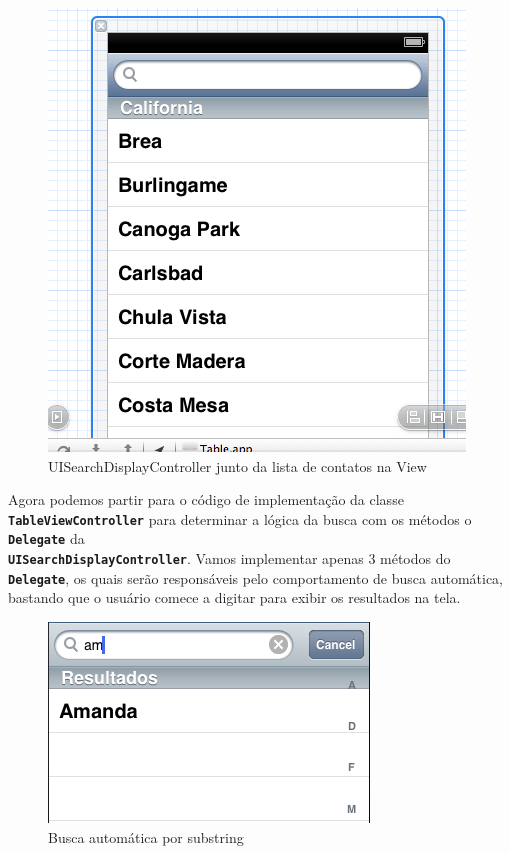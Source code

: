 \documentclass[a4paper,12pt,brazil,doubleside]{book}
\begin{document}
\begin{singlespace}
\begin{figure}[H]
  \centering
  \includegraphics[width=.75\textwidth]{figuras/table/table1.png}
  \caption{UISearchDisplayController junto da lista de contatos na View}
  \label{fig:a}
\end{figure}

\bigskip


Agora podemos partir para o código de implementação da classe \texttt{\textbf{TableViewController}} para determinar a lógica da busca com os métodos o \texttt{\textbf{Delegate}} da\\
\texttt{\textbf{UISearchDisplayController}}. Vamos implementar apenas 3 métodos do \texttt{\textbf{Delegate}}, os quais serão responsáveis pelo comportamento de busca automática, bastando que o usuário comece a digitar para exibir os resultados na tela.

\bigskip
\bigskip

\begin{figure}[H]
  \centering
  \includegraphics[width=.75\textwidth]{figuras/table/table7.png}
  \caption{Busca automática por substring}
  \label{fig:a}
\end{figure}


\end{singlespace}
\end{document}
